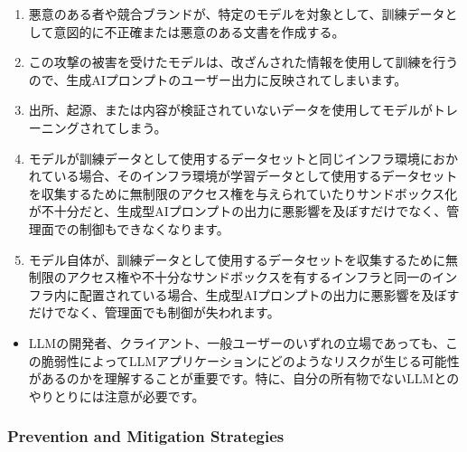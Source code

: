 \documentclass[
]{article}
\providecommand{\tightlist}{%
  \setlength{\itemsep}{0pt}\setlength{\parskip}{0pt}}
\begin{document}
\begin{enumerate}
\def\labelenumi{\arabic{enumi}.}
\item
  悪意のある者や競合ブランドが、特定のモデルを対象として、訓練データとして意図的に不正確または悪意のある文書を作成する。
\item
  この攻撃の被害を受けたモデルは、改ざんされた情報を使用して訓練を行うので、生成AIプロンプトのユーザー出力に反映されてしまいます。
\item
  出所、起源、または内容が検証されていないデータを使用してモデルがトレーニングされてしまう。
\item
  モデルが訓練データとして使用するデータセットと同じインフラ環境におかれている場合、そのインフラ環境が学習データとして使用するデータセットを収集するために無制限のアクセス権を与えられていたりサンドボックス化が不十分だと、生成型AIプロンプトの出力に悪影響を及ぼすだけでなく、管理面での制御もできなくなります。
\item
  モデル自体が、訓練データとして使用するデータセットを収集するために無制限のアクセス権や不十分なサンドボックスを有するインフラと同一のインフラ内に配置されている場合、生成型AIプロンプトの出力に悪影響を及ぼすだけでなく、管理面でも制御が失われます。
\end{enumerate}

\begin{itemize}
\tightlist
\item
  LLMの開発者、クライアント、一般ユーザーのいずれの立場であっても、この脆弱性によってLLMアプリケーションにどのようなリスクが生じる可能性があるのかを理解することが重要です。特に、自分の所有物でないLLMとのやりとりには注意が必要です。
\end{itemize}

\subsubsection{Prevention and Mitigation
Strategies}\label{prevention-and-mitigation-strategies}
\end{document}
